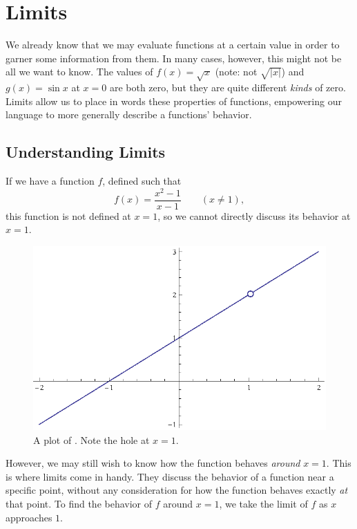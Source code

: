 \chapter{Limits}\label{ch:limits}
We already know that we may evaluate functions at a certain value in order to
garner some information from them.
In many cases, however, this might not be all we want to know.
The values of $f(x)=\sqrt{x}$ (note: not $\sqrt{|x|}$) and
$g(x)=\sin{x}$ at $x=0$ 
are both zero, but they are quite different \emph{kinds} of zero.
Limits allow us to place in words these properties of functions, empowering
our language to more generally describe a functions' behavior.
\section{Understanding Limits}
If we have a function \(f\), defined such that
\begin{equation}
  f(x)=\frac{x^2-1}{x-1} \qquad (x \neq 1),
  \label{eq:firstlimit}
\end{equation}
this function is not defined at \(x=1\), so we cannot directly discuss its behavior at \(x=1\).
\begin{figure}[h]
  \begin{center}
    \includegraphics[scale=0.7]{graphs/p1ch3x2m1xm1}
  \end{center}
  \caption{A plot of . Note the hole at \(x=1\).}
\end{figure}
However, we may still wish to know how the function behaves \emph{around} \(x=1\).
This is where limits come in handy.
They discuss the behavior of a function near a specific point, without any consideration for how the function behaves exactly \emph{at} that point.
To find the behavior of \(f\) around \(x=1\), we take the limit of \(f\) as \(x\) approaches \(1\).
